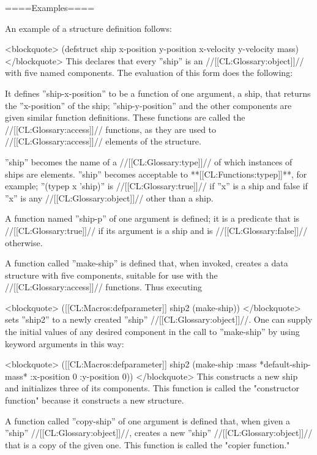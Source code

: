 ====Examples====

An example of a structure definition follows:

<blockquote> (defstruct ship x-position y-position x-velocity y-velocity mass) </blockquote> This declares that every ''ship'' is an //[[CL:Glossary:object]]// with five named components. The evaluation of this form does the following:

\beginlist {} It defines ''ship-x-position'' to be a function of one argument, a ship, that returns the ''x-position'' of the ship; ''ship-y-position'' and the other components are given similar function definitions. These functions are called the //[[CL:Glossary:access]]// functions, as they are used to //[[CL:Glossary:access]]// elements of the structure.

 ''ship'' becomes the name of a //[[CL:Glossary:type]]// of which instances of ships are elements. ''ship'' becomes acceptable to **[[CL:Functions:typep]]**, for example; ''(typep x 'ship)'' is //[[CL:Glossary:true]]// if ''x'' is a ship and false if ''x'' is any //[[CL:Glossary:object]]// other than a ship.

 A function named ''ship-p'' of one argument is defined; it is a predicate that is //[[CL:Glossary:true]]// if its argument is a ship and is //[[CL:Glossary:false]]// otherwise.

 A function called ''make-ship'' is defined that, when invoked, creates a data structure with five components, suitable for use with the //[[CL:Glossary:access]]// functions. Thus executing

<blockquote> ([[CL:Macros:defparameter]] ship2 (make-ship)) </blockquote> sets ''ship2'' to a newly created ''ship'' //[[CL:Glossary:object]]//. One can supply the initial values of any desired component in the call to ''make-ship'' by using keyword arguments in this way:

<blockquote> ([[CL:Macros:defparameter]] ship2 (make-ship :mass *default-ship-mass* :x-position 0 :y-position 0)) </blockquote> This constructs a new ship and initializes three of its components. This function is called the "constructor function" because it constructs a new structure.

 A function called ''copy-ship'' of one argument is defined that, when given a ''ship'' //[[CL:Glossary:object]]//, creates a new ''ship'' //[[CL:Glossary:object]]// that is a copy of the given one. This function is called the "copier function." \endlist

